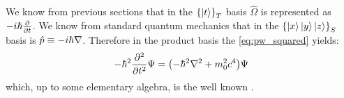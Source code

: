 We know from previous sections that in the $\qty{\ket{t}}_T$ basis $\hat{\Omega}$ is represented as
$-i\hbar\pdv{t}$. We know from standard quantum mechanics that in the $\qty{\ket{x}\ket{y}\ket{z}}_S$
basis is $\hat{p} \equiv -i\hbar\nabla$. Therefore in the product basis the \eqref{eq:pw_squared} yields:
\begin{equation}\label{eq:proto_kg}
  -\hbar^2\pdv[2]{t}\Psi = \qty(-\hbar^2\nabla^2 + m_0^2 c^4)\Psi
\end{equation}
which, up to some elementary algebra, is the well known .
